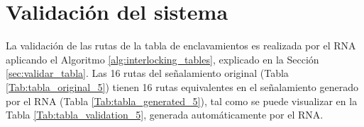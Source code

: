 \section{Validación del sistema}

    La validación de las rutas de la tabla de enclavamientos es realizada por el RNA aplicando el Algoritmo \ref{alg:interlocking_tables}, explicado en la Sección \ref{sec:validar_tabla}. Las 16 rutas del señalamiento original (Tabla \ref{Tab:tabla_original_5}) tienen 16 rutas equivalentes en el señalamiento generado por el RNA (Tabla \ref{Tab:tabla_generated_5}), tal como se puede visualizar en la Tabla \ref{Tab:tabla_validation_5}, generada automáticamente por el RNA.

    \begin{table}[!h]
        {
        \caption{Equivalencias entre las rutas originales y las generadas por el RNA.}
        \label{Tab:tabla_validation_5}
        \centering
        }
\end{table}
